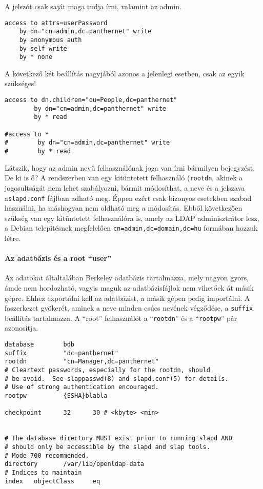 A jelszót csak saját maga tudja írni, valamint az admin.

\begin{Verbatim}[frame=single]
access to attrs=userPassword
    by dn="cn=admin,dc=panthernet" write
    by anonymous auth
    by self write
    by * none
\end{Verbatim}    

A következő két beállítás nagyjából azonos a jelenlegi esetben, csak az egyik szükséges!

\begin{Verbatim}[frame=single]
access to dn.children="ou=People,dc=panthernet"
        by dn="cn=admin,dc=panthernet" write
        by * read

#access to *
#        by dn="cn=admin,dc=panthernet" write
#        by * read
\end{Verbatim}


Látszik, hogy az admin nevű felhasználónak joga van írni bármilyen bejegyzést. De ki is ő? A rendszerben van egy
kitüntetett felhasználó (\texttt{rootdn}, akinek a jogosultságát nem lehet szabályozni, bármit módosíthat, a
neve és a jelszava a\texttt{slapd.conf} fájlban adható meg. Éppen ezért csak bizonyos esetekben szabad használni, ha
máshogyan nem oldható meg a módosítás. Ebből következően szükség van egy kitüntetett felhasználóra is, amely az LDAP
adminisztrátor lesz, a Debian telepítésnek megfelelően \texttt{cn=admin,dc=domain,dc=hu} formában hozzuk létre.


\paragraph{Az adatbázis és a root ``user''} Az adatokat általtalában Berkeley adatbázis tartalmazza, mely nagyon
gyors, ámde nem hordozható, vagyis maguk az adatbázisfájlok nem vihetőek át másik gépre. Ehhez exportálni kell az
adatbázist, a másik gépen pedig importálni. A faszerkezet gyökerét, aminek a neve minden csúcs nevének végződése, a
\texttt{suffix} beállítás tartalmazza. A ``root'' felhasználót a ``\texttt{rootdn}'' és a ``\texttt{rootpw}'' pár
azonosítja.

\begin{Verbatim}[frame=single]
database        bdb
suffix          "dc=panthernet"
rootdn          "cn=Manager,dc=panthernet"
# Cleartext passwords, especially for the rootdn, should
# be avoid.  See slappasswd(8) and slapd.conf(5) for details.
# Use of strong authentication encouraged.
rootpw          {SSHA}blabla

checkpoint      32      30 # <kbyte> <min>


# The database directory MUST exist prior to running slapd AND
# should only be accessible by the slapd and slap tools.
# Mode 700 recommended.
directory       /var/lib/openldap-data
# Indices to maintain
index   objectClass     eq
\end{Verbatim}

